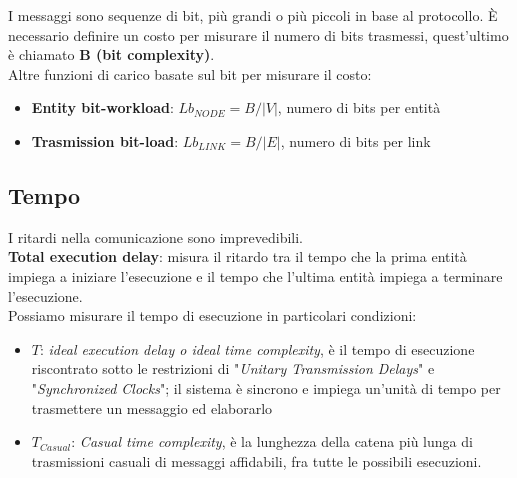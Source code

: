 I messaggi sono sequenze di bit, più grandi o più piccoli in base al protocollo.
È necessario definire un costo per misurare il numero di bits trasmessi,
quest'ultimo è chiamato \textbf{B (bit complexity)}.\\
Altre funzioni di carico basate sul bit per misurare il costo:
\begin{itemize}
    \item \textbf{Entity bit-workload}: $Lb_{NODE} = B / |V|$, numero di bits per
          entità
    \item \textbf{Trasmission bit-load}: $Lb_{LINK} = B / |E|$, numero di bits per
          link
\end{itemize}

\subsection{Tempo}
I ritardi nella comunicazione sono imprevedibili.\\
\textbf{Total execution delay}: misura il ritardo tra il tempo che la prima
entità impiega a iniziare l'esecuzione e il tempo che l'ultima entità impiega a
terminare l'esecuzione.\\
Possiamo misurare il tempo di esecuzione in particolari condizioni:
\begin{itemize}
    \item \textbf{$T$}: \textit{ideal execution delay o ideal time complexity}, è
          il tempo di esecuzione riscontrato sotto le restrizioni di "\textit{Unitary
              Transmission Delays}" e "\textit{Synchronized Clocks}"; il sistema è sincrono
          e impiega un'unità di tempo per trasmettere un messaggio ed elaborarlo
    \item \textbf{$T_{Casual}$}: \textit{Casual time complexity}, è la lunghezza
          della catena più lunga di trasmissioni casuali di messaggi affidabili, fra
          tutte le possibili esecuzioni.
\end{itemize}

